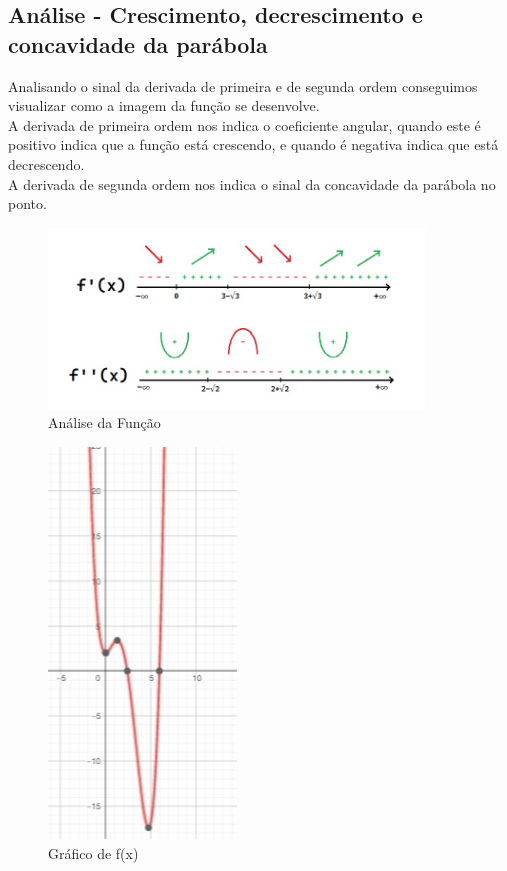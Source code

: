 \documentclass{article}
\begin{document}
\subsection{Análise - Crescimento, decrescimento e concavidade da parábola}
Analisando o sinal da derivada de primeira e de segunda ordem conseguimos visualizar como a imagem da função se desenvolve. 
\\ 
A derivada de primeira ordem nos indica o coeficiente angular, quando este é positivo indica que a função está crescendo, e quando é negativa indica que está decrescendo.
\\
A derivada de segunda ordem nos indica o sinal da concavidade da parábola no ponto.
\begin{figure}[h]
\centering
\includegraphics[width=10cm]{pics/analise.jpg} 
\caption{Análise da Função}
\label{figura:analise}
\end{figure}


\begin{figure}[h]
\centering
\includegraphics[width=5cm]{pics/3questao.jpeg} 
\caption{Gráfico de f(x)}
\end{figure}
\end{document}
